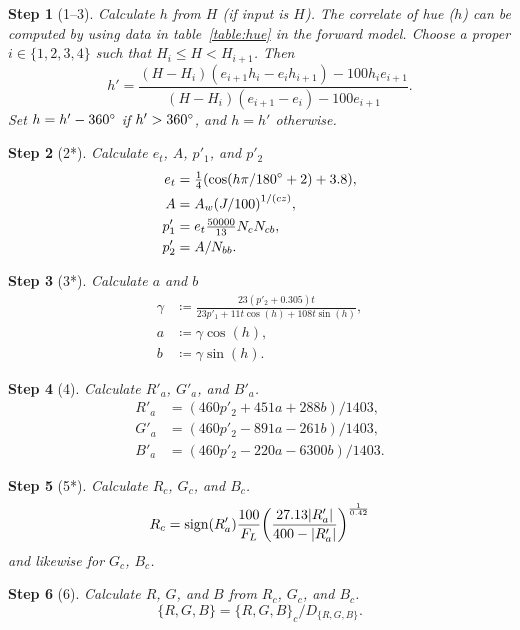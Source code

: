 \documentclass[twocolumn]{scrartcl}
\theoremstyle{named}
\newtheorem*{step}{Step}
\DeclarePairedDelimiter\abs{\lvert}{\rvert}%
\DeclareMathOperator{\sign}{sign}
\begin{document}
\begin{step}[1--3]
Calculate $h$ from $H$ (if input is $H$).
The correlate of hue ($h$) can be computed by using data in
table~\ref{table:hue} in the forward model.
Choose a proper $i\in\{1,2,3,4\}$ such that
$H_i \le H < H_{i+1}$. Then
\[
  h' = \frac{(H-H_i)(e_{i+1}h_i - e_i h_{i+1}) - 100 h_i e_{i+1}}{(H-H_i)(e_{i+1}-e_i) - 100 e_{i+1}}.
\]
Set $h = h' - 360\degree$ if $h' > 360\degree$, and $h=h'$ otherwise.
\end{step}

\begin{step}[2*]
Calculate $e_t$, $A$, $p'_1$, and $p'_2$
\begin{align*}
  e_t &= \tfrac{1}{4} (\cos(h\pi/180\degree + 2) + 3.8),\\
  A &= A_w  {(J/100)}^{1/(cz)},\\
  p'_1 &= e_t \tfrac{50000}{13} N_c N_{cb},\\
  p'_2 &= A / N_{bb}.
\end{align*}
\end{step}

\begin{step}[3*]
Calculate $a$ and $b$
  \begin{align*}
    \gamma &\coloneqq \frac{23 (p'_2+0.305) t}{23 p'_1 + 11 t \cos(h) + 108 t \sin(h)},\\
    a &\coloneqq \gamma \cos(h),\\
    b &\coloneqq \gamma \sin(h).
  \end{align*}
\end{step}

\begin{step}[4]
  Calculate $R'_a$, $G'_a$, and $B'_a$.
  \begin{align*}
    R'_a &= (460 p'_2 + 451 a + 288 b) / 1403,\\
    G'_a &= (460 p'_2 - 891 a - 261 b) / 1403,\\
    B'_a &= (460 p'_2 - 220 a - 6300 b) / 1403.
  \end{align*}%
\end{step}

\begin{step}[5*]
Calculate $R_c$, $G_c$, and $B_c$.
\[
  R_c = \sign(R'_a) \frac{100}{F_L} {\left(
    \frac{27.13 \abs{R'_a}}{400 - \abs{R'_a}}
    \right)}^{\frac{1}{0.42}}
\]
and likewise for $G_c$, $B_c$.
\end{step}

\begin{step}[6]
Calculate $R$, $G$, and $B$ from $R_c$, $G_c$, and $B_c$.
\[
  \{R,G,B\} = {\{R,G,B\}}_c / D_{\{R,G,B\}}.
\]
\end{step}
\end{document}

